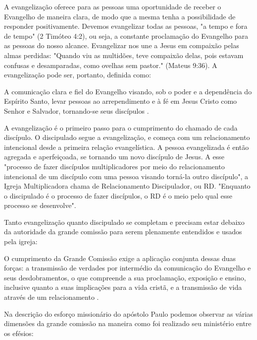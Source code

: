 \documentclass[12pt,openright,oneside,a4paper]{abntex2}
\begin{document}
A evangelização oferece para as pessoas uma oportunidade de receber o Evangelho de maneira clara, de modo que a mesma tenha a possibilidade de responder positivamente. Devemos evangelizar todas as pessoas, "a tempo e fora de tempo" (2 Timóteo 4:2), ou seja, a constante proclamação do Evangelho para as pessoas do nosso alcance. Evangelizar nos une a Jesus em compaixão pelas almas perdidas: "Quando viu as multidões, teve compaixão delas, pois estavam confusas e desamparadas, como ovelhas sem pastor." (Mateus 9:36). A evangelização pode ser, portanto, definida como: 

\begin{citacao}A comunicação clara e fiel do Evangelho visando, sob o poder e a dependência do Espírito Santo, levar pessoas ao arrependimento e à fé em Jesus Cristo como Senhor e Salvador, tornando-se seus discípulos \cite[p. 57]{brandao}.\end{citacao}

A evangelização é o primeiro passo para o cumprimento do chamado de cada discípulo. O discipulado segue a evangelização, e começa com um relacionamento intencional desde a primeira relação evangelística. A pessoa evangelizada é então agregada e aperfeiçoada, se tornando um novo discípulo de Jesus. A esse "processo de fazer discípulos multiplicadores por meio do relacionamento intencional de um discípulo com uma pessoa visando torná-la outro discípulo"\cite[p. 64]{brandao}, a Igreja Multiplicadora chama de Relacionamento Discipulador, ou RD. "Enquanto o discipulado é o processo de fazer discípulos, o RD é o meio pelo qual esse processo se desenvolve"\cite[p. 64]{brandao}.

Tanto evangelização quanto discipulado se completam e precisam estar debaixo da autoridade da grande comissão para serem plenamente entendidos e usados pela igreja:

\begin{citacao}O cumprimento da Grande Comissão exige a aplicação conjunta dessas duas forças: a transmissão de verdades por intermédio da comunicação do Evangelho e seus desdobramentos, o que compreende a sua proclamação, exposição e ensino, inclusive quanto a suas implicações para a vida cristã, e a transmissão de	vida através de um relacionamento \cite[p. 66]{brandao}.\end{citacao} 

Na descrição do esforço missionário do apóstolo Paulo podemos observar as várias dimensões da grande comissão na maneira como foi realizado seu ministério entre os efésios:
\end{document}
